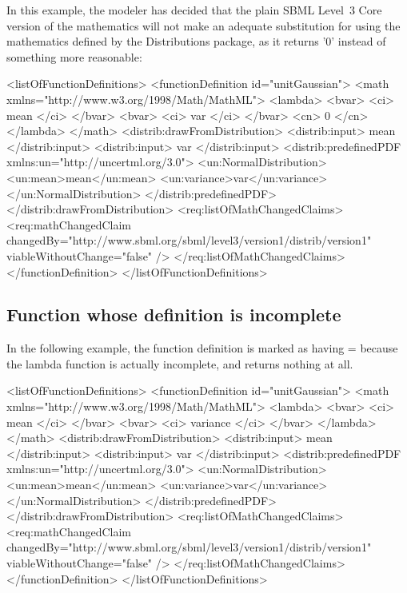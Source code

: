 In this example, the modeler has decided that the plain SBML Level~3 Core version of the mathematics will not make an adequate substitution for using the mathematics defined by the Distributions package, as it returns '0' instead of something more reasonable:

\begin{example}
<listOfFunctionDefinitions> 
  <functionDefinition id="unitGaussian"> 
    <math xmlns="http://www.w3.org/1998/Math/MathML"> 
      <lambda>
        <bvar>
          <ci> mean </ci>
        </bvar>
        <bvar>
          <ci> var </ci>
        </bvar>
        <cn> 0 </cn>
      </lambda>
    </math> 
    <distrib:drawFromDistribution>
      <distrib:input> mean </distrib:input>
      <distrib:input> var </distrib:input>
      <distrib:predefinedPDF xmlns:un="http://uncertml.org/3.0">
         <un:NormalDistribution>
           <un:mean>mean</un:mean>
           <un:variance>var</un:variance>
         </un:NormalDistribution>
      </distrib:predefinedPDF>
    </distrib:drawFromDistribution>
    <req:listOfMathChangedClaims>
      <req:mathChangedClaim changedBy="http://www.sbml.org/sbml/level3/version1/distrib/version1"
                            viableWithoutChange="false" />
    </req:listOfMathChangedClaims>
  </functionDefinition> 
</listOfFunctionDefinitions> 
\end{example} 


\subsection{Function whose definition is incomplete}

In the following example, the function definition is marked as having = because the lambda function is actually incomplete, and returns nothing at all.

\begin{example}
<listOfFunctionDefinitions> 
  <functionDefinition id="unitGaussian"> 
    <math xmlns="http://www.w3.org/1998/Math/MathML"> 
      <lambda>
        <bvar>
          <ci> mean </ci>
        </bvar>
        <bvar>
          <ci> variance </ci>
        </bvar>
      </lambda>
    </math> 
    <distrib:drawFromDistribution>
      <distrib:input> mean </distrib:input>
      <distrib:input> var </distrib:input>
      <distrib:predefinedPDF xmlns:un="http://uncertml.org/3.0">
         <un:NormalDistribution>
           <un:mean>mean</un:mean>
           <un:variance>var</un:variance>
         </un:NormalDistribution>
      </distrib:predefinedPDF>
    </distrib:drawFromDistribution>
    <req:listOfMathChangedClaims>
      <req:mathChangedClaim changedBy="http://www.sbml.org/sbml/level3/version1/distrib/version1"
                            viableWithoutChange="false" />
    </req:listOfMathChangedClaims>
  </functionDefinition> 
</listOfFunctionDefinitions> 
\end{example}
